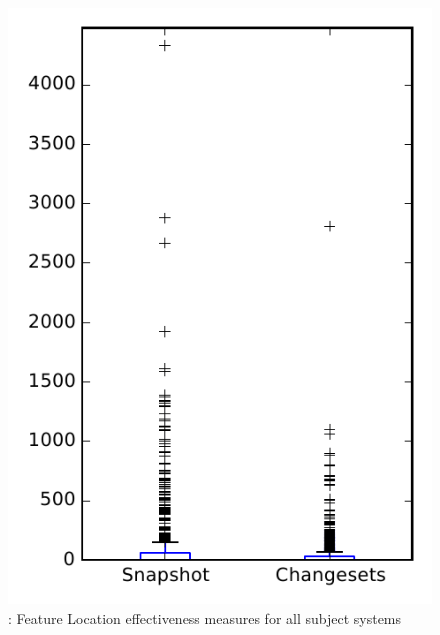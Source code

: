 
\begin{figure}
\centering
\includegraphics[height=0.4\textheight]{figures/flt/rq1_overview}
\caption{\fone: Feature Location effectiveness measures for all subject systems}
\label{fig:flt:rq1:overview}
\end{figure}
